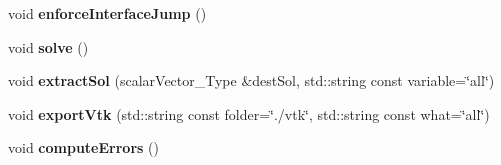 \begin{DoxyCompactItemize}
\mbox{\label{classProblem_a11a26fc7135168c8b473f5c14550688c}} 
void {\bfseries enforce\+Interface\+Jump} ()
\item 
\mbox{\label{classProblem_a457a3efef1d18906da44294d2982317e}} 
void {\bfseries solve} ()
\item 
\mbox{\label{classProblem_af4aa8a2e68cc79e1ec35bbcbc7c7ba9b}} 
void {\bfseries extract\+Sol} (scalar\+Vector\+\_\+\+Type \&dest\+Sol, std\+::string const variable=\char`\"{}all\char`\"{})
\item 
\mbox{\label{classProblem_a22f7a6dd40d34b6d442c98fa855fd029}} 
void {\bfseries export\+Vtk} (std\+::string const folder=\char`\"{}./vtk\char`\"{}, std\+::string const what=\char`\"{}all\char`\"{})
\item 
\mbox{\label{classProblem_ae219d0fe3034f3743b42542c18689d41}} 
void {\bfseries compute\+Errors} ()
\end{DoxyCompactItemize}

